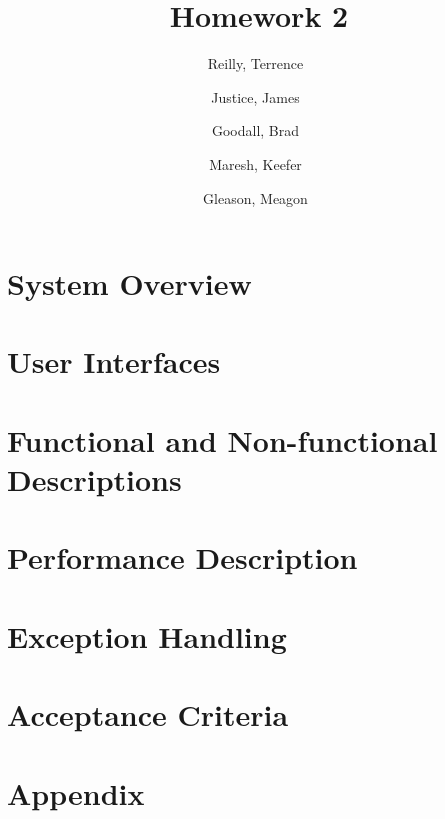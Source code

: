 \documentclass[a4paper,12pt]{article}
\author{
    Reilly, Terrence\
    \and
    Justice, James\
    \and
    Goodall, Brad\
    \and
    Maresh, Keefer\
    \and
    Gleason, Meagon\
}
\title{Homework 2}
\begin{document}
    \nocite{*}
    \maketitle

    \section*{System Overview}
        

    \section*{User Interfaces}
        

    \section*{Functional and Non-functional Descriptions}
        

    \section*{Performance Description}
        

    \section*{Exception Handling}
        

    \section*{Acceptance Criteria}
        

    
    

    \section*{Appendix}
        
\end{document}
